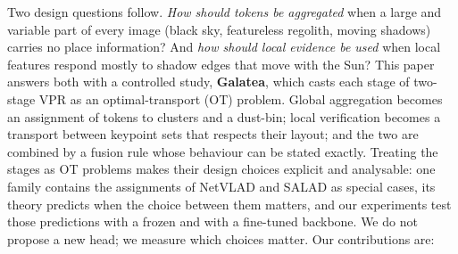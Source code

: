 Two design questions follow. \emph{How should tokens be aggregated} when a large and variable part of
every image (black sky, featureless regolith, moving shadows) carries no place information? And
\emph{how should local evidence be used} when local features respond mostly to shadow edges that move
with the Sun? This paper answers both with a controlled study, \textbf{Galatea}, which casts each stage
of two-stage VPR as an optimal-transport (OT) problem. Global aggregation becomes an assignment of
tokens to clusters and a dust-bin; local verification becomes a transport between keypoint sets that
respects their layout; and the two are combined by a fusion rule whose behaviour can be stated
exactly. Treating the stages as OT problems makes their design choices explicit and analysable: one family
contains the assignments of NetVLAD and SALAD as special cases, its theory predicts when the choice
between them matters, and our experiments test those predictions with a frozen and with a fine-tuned
backbone. We do not propose a new head; we measure which choices matter. Our contributions are:
